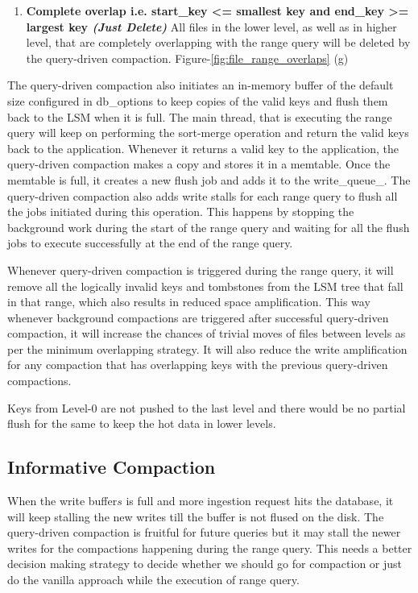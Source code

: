 \begin{enumerate}
    \item \textbf{Complete overlap i.e. start\_key <= smallest key and end\_key >= largest key 
    \textit{(Just Delete)}} All files in the lower level, as well as in higher level, that are completely overlapping 
    with the range query will be deleted by the query-driven compaction. Figure-\ref{fig:file_range_overlaps} (g)
\end{enumerate}
The query-driven compaction also initiates an in-memory buffer of the default size configured in db\_options to keep 
copies of the valid keys and flush them back to the LSM when it is full. The main thread, that is executing the range 
query will keep on performing the sort-merge operation and return the valid keys back to the application. Whenever it 
returns a valid key to the application, the query-driven compaction makes a copy and stores it in a memtable. Once the 
memtable is full, it creates a new flush job and adds it to the write\_queue\_. The query-driven compaction also adds 
write stalls for each range query to flush all the jobs initiated during this operation. This happens by stopping the 
background work during the start of the range query and waiting for all the flush jobs to execute successfully at the 
end of the range query.

Whenever query-driven compaction is triggered during the range query, it will remove all the logically invalid keys and 
tombstones from the LSM tree that fall in that range, which also results in reduced space amplification. This way 
whenever background compactions are triggered after successful query-driven compaction, it will increase the chances of 
trivial moves of files between levels as per  the minimum overlapping strategy. It will also reduce the write 
amplification for any compaction that has overlapping keys with the previous query-driven compactions.

Keys from Level-0 are not pushed to the last level and there would be no partial flush for the same to 
keep the hot data in lower levels.

\subsection{Informative Compaction}

When the write buffer\(s\) is full and more ingestion request hits the database, it will keep stalling the new writes 
till the buffer is not flused on the disk. The query-driven compaction is fruitful for future queries but it may stall the 
newer writes for the compactions happening during the range query. This needs a better decision making
strategy to decide whether we should go for compaction or just do the vanilla approach while the execution of range query.

